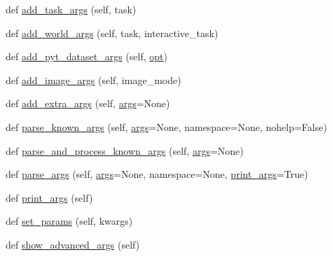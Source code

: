 \begin{DoxyCompactItemize}
\item 
def \hyperlink{classparlai_1_1core_1_1params_1_1ParlaiParser_a61ff766a70bd11365cbcbf71431ce527}{add\+\_\+task\+\_\+args} (self, task)
\item 
def \hyperlink{classparlai_1_1core_1_1params_1_1ParlaiParser_adb8c8064530f9cf9be57ab533360079c}{add\+\_\+world\+\_\+args} (self, task, interactive\+\_\+task)
\item 
def \hyperlink{classparlai_1_1core_1_1params_1_1ParlaiParser_a7d85a5e2fac2c1e8f0f75a4255850b9b}{add\+\_\+pyt\+\_\+dataset\+\_\+args} (self, \hyperlink{classparlai_1_1core_1_1params_1_1ParlaiParser_aa7c461e146b468d033fea1d1dcd92bcf}{opt})
\item 
def \hyperlink{classparlai_1_1core_1_1params_1_1ParlaiParser_a33d186a0cd665df88726b96f1bc3d88e}{add\+\_\+image\+\_\+args} (self, image\+\_\+mode)
\item 
def \hyperlink{classparlai_1_1core_1_1params_1_1ParlaiParser_ade9c068595c2b1110d019f3dedeb79ba}{add\+\_\+extra\+\_\+args} (self, \hyperlink{classparlai_1_1core_1_1params_1_1ParlaiParser_a27d35bfa073588bf887cbdbf45c19f39}{args}=None)
\item 
def \hyperlink{classparlai_1_1core_1_1params_1_1ParlaiParser_a2a98c07f7393108ad67773951038f191}{parse\+\_\+known\+\_\+args} (self, \hyperlink{classparlai_1_1core_1_1params_1_1ParlaiParser_a27d35bfa073588bf887cbdbf45c19f39}{args}=None, namespace=None, nohelp=False)
\item 
def \hyperlink{classparlai_1_1core_1_1params_1_1ParlaiParser_a0409771a420d08fb51a792a089806c70}{parse\+\_\+and\+\_\+process\+\_\+known\+\_\+args} (self, \hyperlink{classparlai_1_1core_1_1params_1_1ParlaiParser_a27d35bfa073588bf887cbdbf45c19f39}{args}=None)
\item 
def \hyperlink{classparlai_1_1core_1_1params_1_1ParlaiParser_ad549d75e2808d63fbc5c5d0e30682f18}{parse\+\_\+args} (self, \hyperlink{classparlai_1_1core_1_1params_1_1ParlaiParser_a27d35bfa073588bf887cbdbf45c19f39}{args}=None, namespace=None, \hyperlink{classparlai_1_1core_1_1params_1_1ParlaiParser_adb1dec3d3433b40209bb2c24722df335}{print\+\_\+args}=True)
\item 
def \hyperlink{classparlai_1_1core_1_1params_1_1ParlaiParser_adb1dec3d3433b40209bb2c24722df335}{print\+\_\+args} (self)
\item 
def \hyperlink{classparlai_1_1core_1_1params_1_1ParlaiParser_a6f1dc42e86af57a7fc4ef9a4c68ca247}{set\+\_\+params} (self, kwargs)
\item 
def \hyperlink{classparlai_1_1core_1_1params_1_1ParlaiParser_a3a75bdeee002ed5a50706f1a6c9797c8}{show\+\_\+advanced\+\_\+args} (self)

\end{DoxyCompactItemize}
